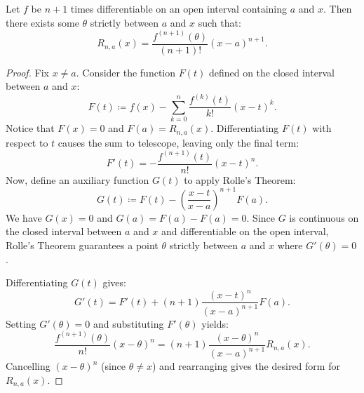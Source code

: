 \documentclass[../analysis1.tex]{subfiles}
\begin{document}
\begin{center}

\end{center}

\begin{theorem}
\label{thm:ttl}
    \begin{shaded*}
        Let $f$ be $n+1$ times differentiable on an open interval containing $a$ and $x$. Then there exists some $\theta$ strictly between $a$ and $x$ such that:
        \[
            R_{n,a}(x) = \frac{f^{(n+1)}(\theta)}{(n+1)!} (x-a)^{n+1}.
        \]
    \end{shaded*}
\end{theorem}

\begin{proof}
    Fix $x \neq a$. Consider the function $F(t)$ defined on the closed interval between $a$ and $x$:
    \[
        F(t) \coloneqq f(x) - \sum_{k=0}^n \frac{f^{(k)}(t)}{k!} (x-t)^k.
    \]
    Notice that $F(x) = 0$ and $F(a) = R_{n,a}(x)$. Differentiating $F(t)$ with respect to $t$ causes the sum to telescope, leaving only the final term:
    \[
        F'(t) = - \frac{f^{(n+1)}(t)}{n!} (x-t)^n.
    \]
    Now, define an auxiliary function $G(t)$ to apply Rolle's Theorem:
    \[
        G(t) \coloneqq F(t) - \left( \frac{x-t}{x-a} \right)^{n+1} F(a).
    \]
    We have $G(x) = 0$ and $G(a) = F(a) - F(a) = 0$. Since $G$ is continuous on the closed interval between $a$ and $x$ and differentiable on the open interval, Rolle's Theorem guarantees a point $\theta$ strictly between $a$ and $x$ where $G'(\theta) = 0$. 
    
    Differentiating $G(t)$ gives:
    \[
        G'(t) = F'(t) + (n+1)\frac{(x-t)^n}{(x-a)^{n+1}} F(a).
    \]
    Setting $G'(\theta) = 0$ and substituting $F'(\theta)$ yields:
    \[
        \frac{f^{(n+1)}(\theta)}{n!} (x-\theta)^n = (n+1)\frac{(x-\theta)^n}{(x-a)^{n+1}} R_{n,a}(x).
    \]
    Cancelling $(x-\theta)^n$ (since $\theta \neq x$) and rearranging gives the desired form for $R_{n,a}(x)$.
\end{proof}
\end{document}
